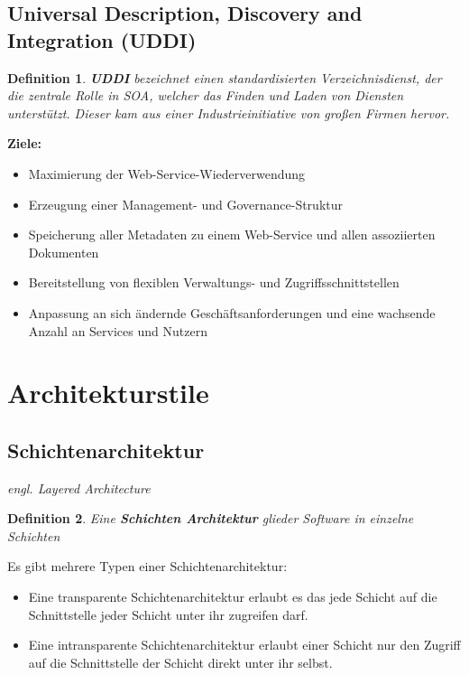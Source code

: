 \documentclass[a4paper]{article}
\theoremstyle{break}
\newtheorem{defi}{Definition}[section]
\begin{document}
\subsection{Universal Description, Discovery and Integration (UDDI)}
\begin{defi}
	\textbf{UDDI} bezeichnet einen standardisierten Verzeichnisdienst, der die zentrale Rolle in SOA, welcher das Finden und Laden von Diensten unterstützt. Dieser kam aus einer Industrieinitiative von großen Firmen hervor.
\end{defi}
\textbf{Ziele:}
\begin{itemize}
	\item Maximierung der Web-Service-Wiederverwendung
	\item Erzeugung einer Management- und Governance-Struktur
	\item Speicherung aller Metadaten zu einem Web-Service und allen assoziierten Dokumenten
	\item Bereitstellung von flexiblen Verwaltungs- und Zugriffsschnittstellen
	\item Anpassung an sich ändernde Geschäftsanforderungen und eine wachsende Anzahl an Services und Nutzern
\end{itemize}
\section{Architekturstile}


\subsection{Schichtenarchitektur}
\textit{engl. Layered Architecture}

\begin{defi}
	Eine \textbf{Schichten Architektur} glieder Software in einzelne Schichten
\end{defi}
Es gibt mehrere Typen einer Schichtenarchitektur: 
\begin{itemize}
	\item Eine transparente Schichtenarchitektur erlaubt es das jede Schicht auf die Schnittstelle jeder Schicht unter ihr zugreifen darf.
	\item Eine intransparente Schichtenarchitektur erlaubt einer Schicht nur den Zugriff auf die Schnittstelle der Schicht direkt unter ihr selbst.
\end{itemize}
\end{document}
